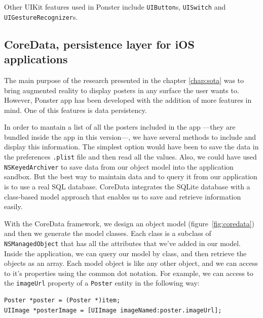 Other UIKit features used in Ponster include \texttt{UIButton}s, \texttt{UISwitch}
and \texttt{UIGestureRecognizer}s. 

\subsection{CoreData, persistence layer for iOS applications}
The main purpose of the research presented in the chapter \ref{chap:sota} was to
bring augmented reality to display posters in any surface the user wants
to. However, Ponster app has been developed with the addition of more features in
mind. One of this features is data persistency.

In order to mantain a list of all the posters included in the app ---they are bundled
inside the app in this version---, we have several methods to include and display
this information. The simplest option would have been to save the data in the preferences
\texttt{.plist} file and then read all the values. Also, we could have used
\texttt{NSKeyedArchiver} to save data from our object model into the application
sandbox. But the best way to maintain data and to
query it from our application is to use a real SQL database. CoreData integrates
the SQLite database with a class-based model approach that enables us to save and
retrieve information easily.

With the CoreData framework, we design an object model (figure~\ref{fig:coredata}) and then we
generate the model classes. Each class is a subclass of \texttt{NSManagedObject}
that has all the attributes that we've added in our model. Inside the application,
we can query our model by class, and then retrieve the objects as an array. Each
model object is like any other object, and we can access to it's properties using
the common dot notation. For example, we can access to the \texttt{imageUrl}
property of a \texttt{Poster} entity in the following way:

\begin{verbatim}
Poster *poster = (Poster *)item;
UIImage *posterImage = [UIImage imageNamed:poster.imageUrl];
\end{verbatim}


